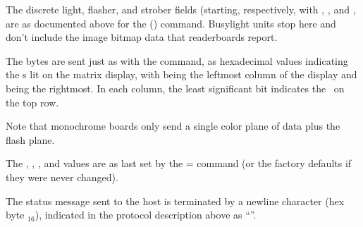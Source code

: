 The discrete light, flasher, and strober fields (starting, respectively, with , , and ,
are as documented above for the  () command. Busylight units stop here and don't include
the image bitmap data that readerboards report.

The  bytes are sent just as with the  command, as hexadecimal values indicating
the \led s lit on the matrix display, with  being the leftmost column of the display
and  being the rightmost. In each column, the least significant bit indicates
the \led\ on the top row.

Note that monochrome boards only send a single color plane of data plus the flash plane.

The , , , and  values are as last set by the \z= command (or the factory
defaults if they were never changed).

The status message sent to the host is terminated by a newline character (hex byte $_{16}$),
indicated in the protocol description above as ``''.


